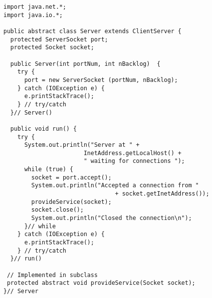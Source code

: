\begin{figure}[htb]
\jjjprogstart
\begin{jjjlisting}[27pc]
\begin{lstlisting}
import java.net.*;
import java.io.*;

public abstract class Server extends ClientServer {
  protected ServerSocket port;
  protected Socket socket;

  public Server(int portNum, int nBacklog)  {
    try {
      port = new ServerSocket (portNum, nBacklog);
    } catch (IOException e) {
      e.printStackTrace();
    } // try/catch
  }// Server()

  public void run() {
    try {
      System.out.println("Server at " + 
                       InetAddress.getLocalHost() +
                       " waiting for connections ");
      while (true) {
        socket = port.accept();
        System.out.println("Accepted a connection from " 
                                + socket.getInetAddress());
        provideService(socket);
        socket.close();
        System.out.println("Closed the connection\n");
      }// while
    } catch (IOException e) {
      e.printStackTrace();
    } // try/catch 
  }// run()

 // Implemented in subclass
 protected abstract void provideService(Socket socket);  
}// Server
\end{lstlisting}
\end{jjjlisting}
\end{figure}


